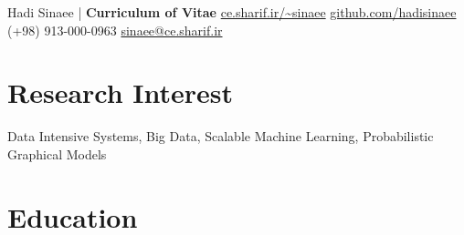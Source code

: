 \documentclass[10pt,a4paper,roman]{moderncv}        %
\begin{document}
 \itemsep \shortSpace
\def\mediumSpace{1.1em}
\def\shortSpace{.6em}

{\color{black} \Huge Hadi Sinaee |}  {\color{grey} \Huge{\textbf{Curriculum of Vitae}}}
\newline
\faGlobe \space \href{ce.sharif.ir/~sinaee}{ce.sharif.ir/\textasciitilde sinaee} 
\quad \faGithub \space \href{https://github.com/hadisinaee}{github.com/hadisinaee}
\quad \faMobile \space (+98) 913-000-0963
\quad \faEnvelope \space \href{mailto:sinaee@ce.sharif.ir?Subject=Hello Hadi!}{sinaee@ce.sharif.ir}

\medskip
\medskip

\section{Research Interest}
Data Intensive Systems, Big Data, Scalable Machine Learning, Probabilistic Graphical Models
\medskip



\section{Education}

\newcommand{\RNum}[1]{\uppercase\expandafter{\romannumeral #1\relax}}

\end{document}
